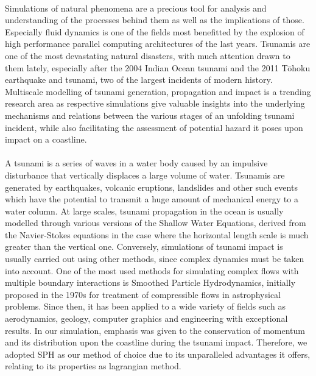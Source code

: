 \documentclass{llncs}
\begin{document}
\paragraph{} Simulations of natural phenomena are a precious tool for analysis and
understanding of the processes behind them as well as the implications of
those. Especially fluid dynamics is one of the fields most benefitted by the explosion of
high performance parallel computing architectures of the last years. Tsunamis are one of
the most devastating natural disasters, with much attention drawn to them lately,
especially after the 2004 Indian Ocean tsunami and the 2011 T\={o}hoku earthquake and
tsunami, two of the largest incidents of modern history. Multiscale modelling of tsunami
generation, propagation and impact is a trending research area as respective simulations
give valuable insights into the underlying mechanisms and relations between the various
stages of an unfolding tsunami incident, while also facilitating the assessment of
potential hazard it poses upon impact on a coastline.

\paragraph{} A tsunami is a series of waves in a water body caused by an impulsive
disturbance that vertically displaces a large volume of water. Tsunamis are generated by
earthquakes, volcanic eruptions, landslides and other such events which have the potential
to transmit a huge amount of mechanical energy to a water column. At large scales, tsunami
propagation in the ocean is usually modelled through various versions of the Shallow Water
Equations, derived from the Navier-Stokes equations in the case where the horizontal
length scale is much greater than the vertical one. Conversely, simulations of tsunami
impact is usually carried out using other methods, since complex dynamics must be taken
into account. One of the most used methods for simulating complex flows with multiple
boundary interactions is Smoothed Particle Hydrodynamics, initially proposed in the 1970s
for treatment of compressible flows in astrophysical problems. Since then, it has been
applied to a wide variety of fields such as aerodynamics, geology, computer graphics and
engineering with exceptional results. In our simulation, emphasis was given to the
conservation of momentum and its distribution upon the coastline during the tsunami
impact. Therefore, we adopted SPH as our method of choice due to its unparalleled
advantages it offers, relating to its properties as lagrangian method.
\end{document}
